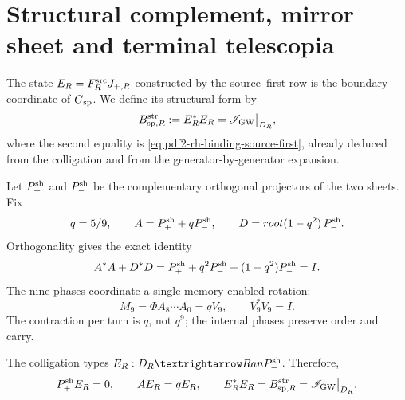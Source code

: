\section{Structural complement, mirror sheet and terminal telescopia}

The state \(E_R=\mathcal F_R^{\rm src}J_{+,R}\) constructed by the
source--first row is the boundary coordinate of
\(\mathfrak G_{\rm sp}\). We define its structural form by
\begin{equation}\label{eq:pdf2-rh-bw-estructural}
 \mathcal B_{{\rm sp},R}^{\rm str}
 :=E_R^*E_R
 =\mathscr I_{\rm GW}\big|_{\mathcal D_R},
\end{equation}
where the second equality is
\eqref{eq:pdf2-rh-binding-source-first}, already deduced from the colligation and from
the generator-by-generator expansion.

Let \(P_+^{\rm sh}\) and \(P_-^{\rm sh}\) be the complementary orthogonal
projectors of the two sheets. Fix
\begin{equation}\label{eq:pdf2-rh-q-a-d}
 q=\frac59,\qquad
 A=P_+^{\rm sh}+qP_-^{\rm sh},\qquad
 D=\sqrt{1-q^2}\,P_-^{\rm sh}.
\end{equation}
Orthogonality gives the exact identity
\begin{equation}\label{eq:pdf2-rh-conservacion-local}
 A^*A+D^*D
 =P_+^{\rm sh}+q^2P_-^{\rm sh}
 +(1-q^2)P_-^{\rm sh}=I.
\end{equation}
The nine phases coordinate a single memory-enabled rotation:
\begin{equation}\label{eq:pdf2-rh-monodromia}
 M_9=\Phi A_8\cdots A_0=qV_9,
 \qquad V_9^*V_9=I.
\end{equation}
The contraction per turn is \(q\), not \(q^9\); the internal phases preserve
order and carry.

The colligation types
\(E_R:\mathcal D_R\to\operatorname{Ran}P_-^{\rm sh}\). Therefore,
\begin{equation}\label{eq:pdf2-rh-binding-espejo}
 P_+^{\rm sh}E_R=0,
 \qquad AE_R=qE_R,
 \qquad
 E_R^*E_R=\mathcal B_{{\rm sp},R}^{\rm str}
 =\mathscr I_{\rm GW}\big|_{\mathcal D_R}.
\end{equation}

